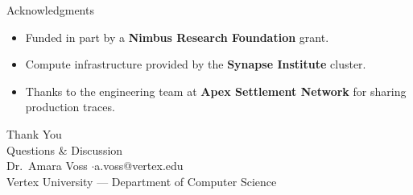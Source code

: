 \documentclass[pdf]{prosper}
\begin{document}
\begin{slide}{Acknowledgments}
\begin{itemize}
\item Funded in part by a \textbf{Nimbus Research Foundation} grant.
\item Compute infrastructure provided by the \textbf{Synapse Institute} cluster.
\item Thanks to the engineering team at \textbf{Apex Settlement Network} for sharing production traces.
\end{itemize}
\end{slide}

\begin{slide}{}
\vspace{2.0cm}
\begin{center}
{\selectfont\color{deepnavy}\Huge Thank You}\\[0.6cm]
{\color{slateblue}\Large Questions \& Discussion}\\[1.0cm]
{\small\color{softgray}
Dr.~Amara Voss \quad$\cdot$\quad a.voss@vertex.edu\\
Vertex University --- Department of Computer Science}
\end{center}
\end{slide}
\end{document}
